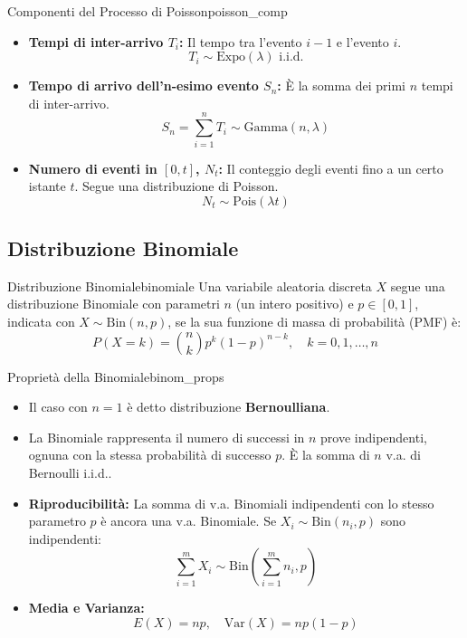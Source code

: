 \begin{proposizione}{Componenti del Processo di Poisson}{poisson_comp}
\begin{itemize}
    \item \textbf{Tempi di inter-arrivo \(T_i\):} Il tempo tra l'evento \(i-1\) e l'evento \(i\).
    \[ T_i \sim \text{Expo}(\lambda) \text{ i.i.d.} \]
    \item \textbf{Tempo di arrivo dell'n-esimo evento \(S_n\):} È la somma dei primi \(n\) tempi di inter-arrivo.
    \[ S_n = \sum_{i=1}^n T_i \sim \text{Gamma}(n, \lambda) \]
    \item \textbf{Numero di eventi in \([0, t]\), \(N_t\):} Il conteggio degli eventi fino a un certo istante \(t\). Segue una distribuzione di Poisson.
    \[ N_t \sim \text{Pois}(\lambda t) \]
\end{itemize}
\end{proposizione}

\subsection{Distribuzione Binomiale}

\begin{definizione}{Distribuzione Binomiale}{binomiale}
Una variabile aleatoria discreta \(X\) segue una distribuzione Binomiale con parametri \(n\) (un intero positivo) e \(p \in [0,1]\), indicata con \(X \sim \text{Bin}(n,p)\), se la sua funzione di massa di probabilità (PMF) è:
\[
P(X=k) = \binom{n}{k} p^k (1-p)^{n-k}, \quad k=0, 1, \dots, n \text{}
\]
\end{definizione}

\begin{proposizione}{Proprietà della Binomiale}{binom_props}
\begin{itemize}
    \item Il caso con \(n=1\) è detto distribuzione \textbf{Bernoulliana}.
    \item La Binomiale rappresenta il numero di successi in \(n\) prove indipendenti, ognuna con la stessa probabilità di successo \(p\). È la somma di \(n\) v.a. di Bernoulli i.i.d..
    \item \textbf{Riproducibilità:} La somma di v.a. Binomiali indipendenti con lo stesso parametro \(p\) è ancora una v.a. Binomiale. Se \(X_i \sim \text{Bin}(n_i, p)\) sono indipendenti:
    \[ \sum_{i=1}^{m} X_i \sim \text{Bin}\left(\sum_{i=1}^{m} n_i, p\right) \text{} \]
    \item \textbf{Media e Varianza:}
    \[ E(X) = np, \quad \text{Var}(X) = np(1-p) \]
\end{itemize}
\end{proposizione}

